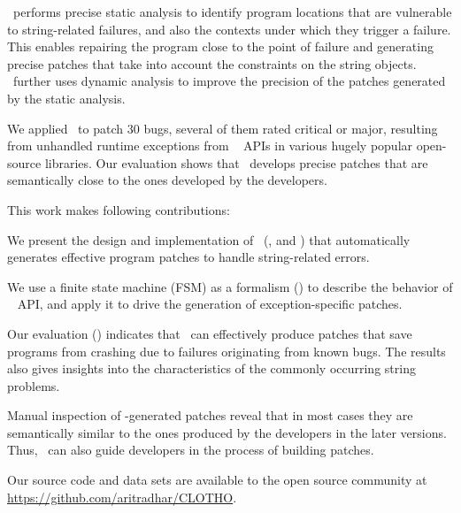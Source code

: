 \tool\ performs precise static analysis to identify program locations that are
vulnerable to string-related failures, and also the contexts under which they
trigger a failure. This enables repairing the program close to the point of
failure and generating precise patches that take into account the constraints on
the string objects.
\tool\ further uses dynamic analysis to improve the precision of the patches
generated by the static analysis.

We applied \tool\ to patch $30$ bugs, several of them rated critical or major,
resulting from unhandled runtime exceptions from \java\  APIs in
various hugely popular open-source libraries. Our evaluation shows that \tool\ 
develops precise patches that are semantically close to the ones developed by
the developers.

This work makes following contributions:
\begin{mylist}

\item We present the design and implementation of \tool\ (,
\xref{sec:design} and \xref{sec:implementation}) that automatically generates effective
program patches to handle string-related errors.

\item We use a finite state machine (FSM) as a formalism () to
describe the behavior of \java\ \code{String} API, and apply it to drive the
generation of exception-specific patches.

\item  Our evaluation () indicates that \tool\ can effectively
produce patches that save programs from crashing due to failures originating
from known bugs. The results also gives insights into the characteristics of the
commonly occurring string problems.

\item Manual inspection of \tool-generated patches reveal that in most cases
they are semantically similar to the ones produced by the developers in the
later versions. 
Thus, \tool\ can also guide developers in the process of building patches.
\end{mylist}

Our source code and data sets are available to the open source community at
\url{https://github.com/aritradhar/CLOTHO}.









